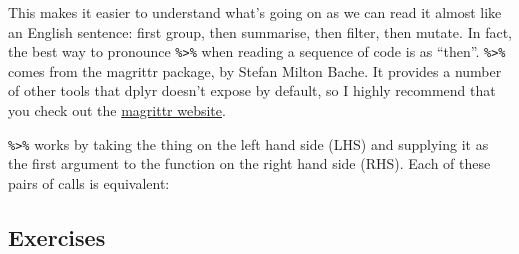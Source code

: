 \begin{Shaded}
\end{Shaded}

This makes it easier to understand what's going on as we can read it
almost like an English sentence: first group, then summarise, then
filter, then mutate. In fact, the best way to pronounce
\texttt{\%\textgreater{}\%} when reading a sequence of code is as
``then''. \texttt{\%\textgreater{}\%} comes from the magrittr package,
by Stefan Milton Bache. It provides a number of other tools that dplyr
doesn't expose by default, so I highly recommend that you check out the
\href{https://github.com/smbache/magrittr}{magrittr website}.

\texttt{\%\textgreater{}\%} works by taking the thing on the left hand
side (LHS) and supplying it as the first argument to the function on the
right hand side (RHS). Each of these pairs of calls is equivalent:

\begin{Shaded}
\end{Shaded}

\subsection{Exercises}\label{exercises-3}

